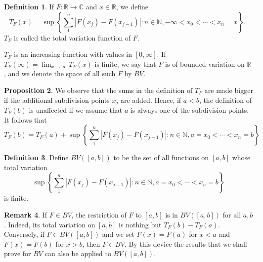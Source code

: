 \documentclass[12pt,a4paper]{book}
\theoremstyle{definition}
\newtheorem{defn}{Definition}[section]
\newtheorem{rema}[defn]{Remark}
\newtheorem{prop}[defn]{Proposition}
\begin{document}
\begin{defn}
    If $F: \mathbb{R} \rightarrow \mathbb{C}$ and $x \in \mathbb{R}$, we define
    $$
        T_F(x)=\sup \left\{\sum_1^n\left|F\left(x_j\right)-F\left(x_{j-1}\right)\right|: n \in \mathbb{N},-\infty<x_0<\cdots<x_n=x\right\} \text {. }
    $$
    $T_F$ is called the total variation function of $F$.

    $T_F$ is an increasing function with values in $[0, \infty]$. If $T_F(\infty)=\lim _{x \rightarrow \infty} T_F(x)$ is finite, we say that $F$ is of bounded variation on $\mathbb{R}$, and we denote the space of all such $F$ by $B V$.
\end{defn}
\begin{prop}
    We observe that the sums in the definition of $T_F$ are made bigger if the additional subdivision points $x_j$ are added. Hence, if $a<b$, the definition of $T_F(b)$ is unaffected if we assume that $a$ is always one of the subdivision points. It follows that
    \begin{equation*}
        T_F(b)=T_F(a)+\sup \left\{\sum_1^n\left|F\left(x_j\right)-F\left(x_{j-1}\right)\right|: n \in \mathbb{N}, a=x_0<\cdots<x_n=b\right\}
    \end{equation*}
\end{prop}
\begin{defn}
    Define $BV([a, b])$ to be the set of all functions on $[a, b]$ whose total variation
    $$\sup \left\{\sum_1^n\left|F\left(x_j\right)-F\left(x_{j-1}\right)\right|: n \in \mathbb{N}, a=x_0<\cdots<x_n=b\right\}$$
    is finite.
\end{defn}
\begin{rema}
    If $F \in B V$, the restriction of $F$ to $[a, b]$ is in $B V([a, b])$ for all $a, b$. 
    Indeed, its total variation on $[a, b]$ is nothing but $T_F(b)-T_F(a)$. Conversely,
    if $F \in B V([a, b])$ and we set $F(x)=F(a)$ for $x<a$ and $F(x)=F(b)$ for $x>b$, then $F \in B V$. By this device the results that we shall prove for $B V$ can also be applied to $B V([a, b])$.
\end{rema}
\end{document}
